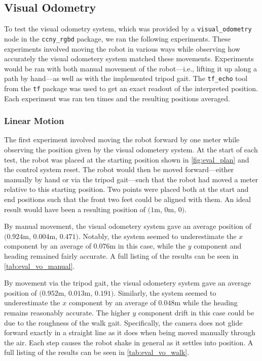 \subsection{Visual Odometry}

To test the visual odometry system, which was provided by a \texttt{visual\_odometry} node in the \texttt{ccny\_rgbd} package, we ran the following experiments. These experiments involved moving the robot in various ways while observing how accurately the visual odometery system matched these movements. Experiments would be ran with both manual movement of the robot---i.e., lifting it up along a path by hand---as well as with the implemented tripod gait. The \texttt{tf\_echo} tool from the \texttt{tf} package was used to get an exact readout of the interpreted position. Each experiment was ran ten times and the resulting positions averaged.

\subsubsection{Linear Motion}

The first experiment involved moving the robot forward by one meter while observing the position given by the visual odometery system. At the start of each test, the robot was placed at the starting position shown in \autoref{fig:eval_plan} and the control system reset. The robot would then be moved forward---either manually by hand or via the tripod gait---such that the robot had moved a meter relative to this starting position. Two points were placed both at the start and end positions such that the front two feet could be aligned with them. An ideal result would have been a resulting position of $(1$m, $0$m, $0$\textdegree{}$)$.

By manual movement, the visual odometery system gave an average position of $(0.924$m, $0.004$m, $0.471$\textdegree{}$)$. Notably, the system seemed to underestimate the $x$ component by an average of $0.076$m in this case, while the $y$ component and heading remained fairly accurate. A full listing of the results can be seen in \autoref{tab:eval_vo_manual}.

By movement via the tripod gait, the visual odometery system gave an average position of $(0.952$m, $0.013$m, $0.191$\textdegree{}$)$. Similarly, the system seemed to underestimate the $x$ component by an average of $0.048$m while the heading remains reasonably accurate. The higher $y$ component drift in this case could be due to the roughness of the walk gait. Specifically, the camera does not glide forward exactly in a straight line as it does when being moved manually through the air. Each step causes the robot shake in general as it settles into position. A full listing of the results can be seen in \autoref{tab:eval_vo_walk}.

